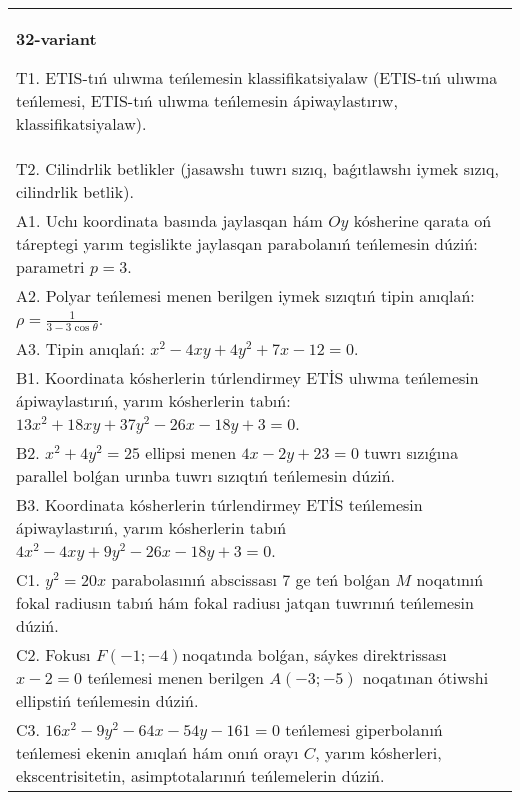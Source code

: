 \documentclass{article}
\begin{document}
\begin{tabular}{m{17cm}}
\textbf{32-variant}
\newline

T1. ETIS-tıń ulıwma teńlemesin klassifikatsiyalaw (ETIS-tıń ulıwma teńlemesi, ETIS-tıń ulıwma teńlemesin ápiwaylastırıw, klassifikatsiyalaw).\\

T2. Cilindrlik betlikler (jasawshı tuwrı sızıq, baǵıtlawshı iymek sızıq, cilindrlik betlik).\\

A1. Uchı koordinata basında jaylasqan hám $Oy$ kósherine qarata oń táreptegi yarım tegislikte jaylasqan parabolanıń teńlemesin dúziń: parametri $p=3$.\\

A2. Polyar teńlemesi menen berilgen iymek sızıqtıń tipin anıqlań: $\rho=\frac{1}{3-3\cos\theta}$.\\

A3. Tipin anıqlań: $x^{2}-4 xy+4 y^{2}+7 x-12=0$.\\

B1. Koordinata kósherlerin túrlendirmey ETİS ulıwma teńlemesin ápiwaylastırıń, yarım kósherlerin tabıń: $13x^{2} + 18xy + 37y^{2} - 26x - 18y + 3 = 0$.  \\

B2. $x^{2} + 4y^{2} = 25$ ellipsi menen $4x - 2y + 23 = 0$ tuwrı sızıǵına parallel bolǵan urınba tuwrı sızıqtıń teńlemesin dúziń.  \\

B3. Koordinata kósherlerin túrlendirmey ETİS teńlemesin ápiwaylastırıń, yarım kósherlerin tabıń $4x^{2} - 4xy + 9y^{2} - 26x - 18y + 3 = 0$.\\

C1. $y^{2} = 20x$ parabolasınıń abscissası 7 ge teń bolǵan $M$ noqatınıń fokal radiusın tabıń hám fokal radiusı jatqan tuwrınıń teńlemesin dúziń.  \\

C2. Fokusı $F( - 1; - 4)$noqatında bolǵan, sáykes direktrissası $x - 2 = 0$ teńlemesi menen berilgen $A( - 3; - 5)$ noqatınan ótiwshi ellipstiń teńlemesin dúziń.  \\

C3. $16x^{2} - 9y^{2} - 64x - 54y - 161 = 0$ teńlemesi giperbolanıń teńlemesi ekenin anıqlań hám onıń orayı $C$, yarım kósherleri, ekscentrisitetin, asimptotalarınıń teńlemelerin dúziń.  \\

\end{tabular}
\vspace{1cm}
\end{document}
